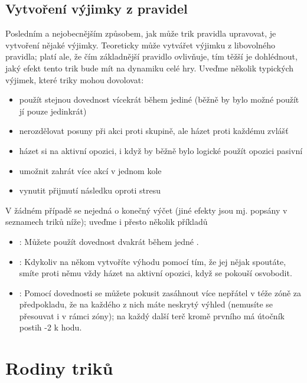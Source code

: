 \documentclass[../main.tex]{subfiles}
\begin{document}
\subsection{Vytvoření výjimky z pravidel}
\label{sec:trik-vyjimky}
Posledním a nejobecnějším způsobem, jak může trik pravidla upravovat, je vytvoření nějaké výjimky. Teoreticky může vytvářet výjimku z libovolného pravidla; platí ale, že čím základnější pravidlo ovlivňuje, tím těžší je dohlédnout, jaký efekt tento trik bude mít na dynamiku celé hry. Uveďme několik typických výjimek, které triky mohou dovolovat:

\begin{itemize}
\item použít stejnou dovednost vícekrát během jediné  (běžně by bylo možné použít jí pouze jedinkrát)
\item nerozdělovat posuny při akci proti skupině, ale házet proti každému zvlášť
\item házet si na aktivní opozici, i když by běžně bylo logické použít opozici pasivní
\item umožnit zahrát více akcí v jednom kole
\item vynutit přijmutí následku oproti stresu
\end{itemize}

V žádném případě se nejedná o konečný výčet (jiné efekty jsou mj. popsány v seznamech triků níže); uveďme i přesto několik příkladů

\begin{itemize}
\item {}:
  Můžete použít dovednost  dvakrát během jedné .
\item {}:
  Kdykoliv na někom vytvoříte výhodu pomocí  tím, že jej nějak spoutáte, smíte proti němu vždy házet na aktivní opozici, když se pokouší osvobodit.
\item {}:
  Pomocí dovednosti  se můžete pokusit zasáhnout více nepřátel v téže zóně za předpokladu, že na každého z nich máte neskrytý výhled (nemusíte se přesouvat i v rámci zóny); na každý další terč kromě prvního má útočník postih -2 k hodu.
\end{itemize}

\section{Rodiny triků}
\label{sec:trik-rodiny}
\end{document}

